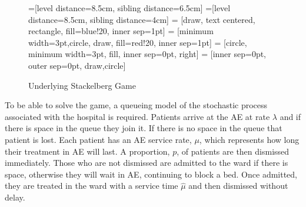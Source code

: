 \documentclass[a0,landscape]{a0poster}
\begin{document}
\begin{multicols}{3}
{\color{black}
\begin{figure}[H]
    \begin{center}
        =[level distance=8.5cm, sibling distance=6.5cm]
        =[level distance=8.5cm, sibling distance=4cm]
         = [draw, text centered, rectangle, fill=blue!20, inner sep=1pt]
         = [minimum width=3pt,circle,  draw, fill=red!20, inner sep=1pt]
         = [circle, minimum width=3pt, fill, inner sep=0pt, right]
         = [inner sep=0pt, outer sep=0pt, draw,circle]
        \caption{Underlying Stackelberg Game}\label{fig:stackelberg_game}
    \end{center}
\end{figure}
}

To be able to solve the game, a queueing model of the stochastic process associated with the hospital is required.
Patients arrive at the AE at rate $\lambda$ and if there is space in the queue they join it.
If there is no space in the queue that patient is lost.
Each patient has an AE service rate, $\mu$, which represents how long their treatment in AE will last.
A proportion, $p$, of patients are then dismissed immediately.
Those who are not dismissed are admitted to the ward if there is space, otherwise they will wait in AE, continuing to block a bed.
Once admitted, they are treated in the ward with a service time $\hat{\mu}$ and then dismissed without delay.


\end{multicols}
\end{document}
